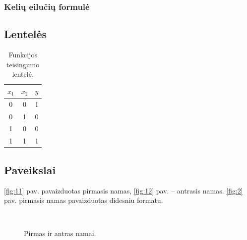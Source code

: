 \documentclass[12pt]{article}
\begin{document}
\subsubsection{Kelių eilučių formulė} \label{keliu}
      
 

 
\subsection{Lentelės} \label{lenteles}

\begin{table}[!htbp]
\caption{Funkcijos teisingumo lentelė.}
	\centering
	\begin{tabular}{|cc|c|}
		\hline
		$x_1$ & $x_2$ & $y$ \\
		\hline
		0 & 0 & 1 \\
		0 & 1 & 0 \\
		1 & 0 & 0 \\
		1 & 1 & 1 \\
		\hline
	\end{tabular}
\end{table}


\subsection{Paveikslai} \label{paveikslai}

\ref{fig:11} pav. pavaizduotas pirmasis namas, \ref{fig:12} pav. -- antrasis namas. \ref{fig:2} pav. pirmasis namas pavaizduotas didesniu formatu. 

\begin{figure}[!htbp] 
\centering
{}\ %
\caption{Pirmas ir antras namai.}
\label{fig:1} 
\end{figure} 
\end{document}
